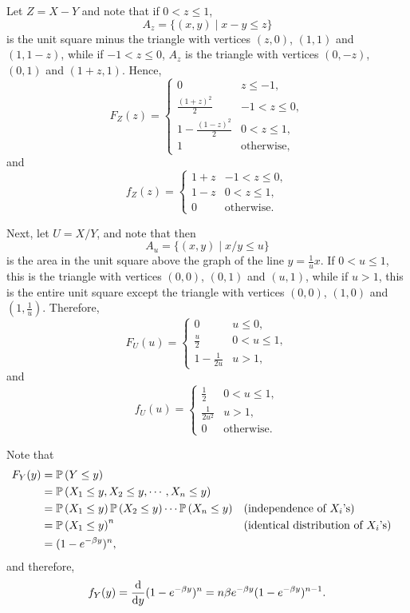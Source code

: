 \begin{ex}
  Let $Z=X-Y$ and note that if $0<z\leq 1$,
  \[
    A_z=\{(x,y)\mid x-y\leq z\}
  \]
  is the unit square minus the triangle with vertices $(z,0)$, $(1,1)$ and
  $(1,1-z)$, while if $-1<z\leq 0$, $A_z$ is the triangle with vertices $(0, -z)$,
  $(0, 1)$ and $(1+z,1)$. Hence,
  \[
    F_Z(z)=\begin{cases}
      0                   & z\leq -1,         \\
      \frac{(1+z)^2}{2}   & -1<z\leq 0,       \\
      1-\frac{(1-z)^2}{2} & 0<z\leq 1,        \\
      1                   & \text{otherwise},
    \end{cases}
  \]
  and
  \[
    f_Z(z)=\begin{cases}
      1+z & -1<z\leq 0,       \\
      1-z & 0<z\leq 1,        \\
      0   & \text{otherwise}.
    \end{cases}
  \]

  Next, let $U=X/Y$, and note that then
  \[
    A_u=\{(x,y)\mid x/y\leq u\}
  \]
  is the area in the unit square above the graph of the line $y=\frac{1}{u}x$.
  If $0<u\leq 1$, this is the triangle with vertices $(0,0)$, $(0, 1)$ and
  $(u, 1)$, while if $u>1$, this is the entire unit square except the triangle
  with vertices $(0, 0)$, $(1, 0)$ and $\left(1, \frac{1}{u}\right)$. Therefore,
  \[
    F_U(u)=\begin{cases}
      0              & u\leq 0,   \\
      \frac{u}{2}    & 0<u\leq 1, \\
      1-\frac{1}{2u} & u> 1,
    \end{cases}
  \]
  and
  \[
    f_U(u)=\begin{cases}
      \frac{1}{2}    & 0<u\leq 1,        \\
      \frac{1}{2u^2} & u>1,              \\
      0              & \text{otherwise}.
    \end{cases}
  \]
\end{ex}

\begin{ex}
  Note that
  \begin{align*}
    F_Y(y)
     & =\P{Y\leq y}                                                                                   \\
     & =\P{X_1\leq y, X_2\leq y, \cdots, X_n\leq y}                                                   \\
     & =\P{X_1\leq y}\P{X_2\leq y}\cdots\P{X_n\leq y} &  & \text{(independence of $X_i$'s)}           \\
     & =\P{X_1\leq y}^n                               &  & \text{(identical distribution of $X_i$'s)} \\
     & =(1-e^{-\beta y})^n,
  \end{align*}
  and therefore,
  \[
    f_Y(y)
    =\frac{\d}{\d{y}} (1-e^{-\beta y})^n
    =n\beta e^{-\beta y}(1-e^{-\beta y})^{n-1}.
  \]
\end{ex}